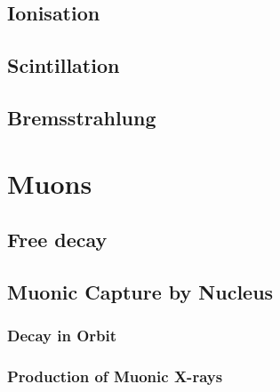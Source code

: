 \subsection{Ionisation} %
\label{sub:ionisation}

\subsection{Scintillation} %
\label{sub:scintillation}

\subsection{Bremsstrahlung} %
\label{sub:bremsstrahlung}

\section{Muons} %
\label{sec:muons}
\subsection{Free decay} %
\label{sub:free_decay}

\subsection{Muonic Capture by Nucleus} %
\label{sub:muonic_capture_by_nucleus}
\subsubsection{Decay in Orbit} %
\label{ssub:decay_in_orbit}

\subsubsection{Production of Muonic X-rays} %
\label{ssub:production_of_muonic_x_rays}

